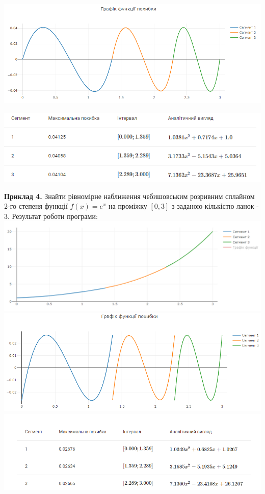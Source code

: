 \documentclass[ukrainian,14pt]{extarticle}
\begin{document}
\vspace{0.5cm}

\includegraphics[scale=0.65]{examples/3_error.png}

\vspace{0.5cm}

\includegraphics[scale=0.8]{examples/3_table.png}

\vspace{1cm}

\newpage
\textbf{Приклад 4.} Знайти рівномірне наближення чебишовським розривним сплайном 2-го степеня функції $f(x)=e^x$ на проміжку $[0, 3]$ з заданою кількістю ланок - $3$.
Результат роботи програми:
\vspace{0.5cm} \\
\includegraphics[scale=0.65]{examples/4_approx.png}
\vspace{0.5cm}
\includegraphics[scale=0.7]{examples/4_error.png}
\vspace{0.5cm}
\includegraphics[scale=0.65]{examples/4_table.png}
\end{document}
